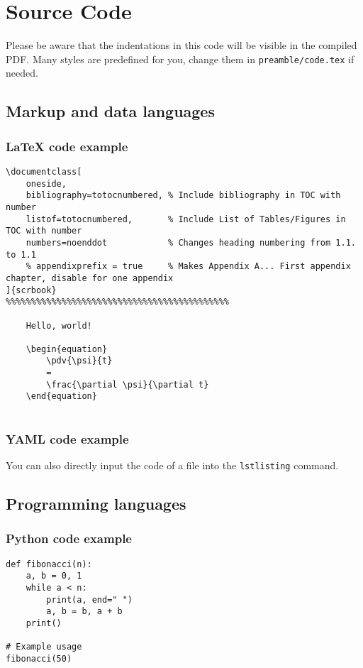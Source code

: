 \chapter{Source Code}

Please be aware that the indentations in this code will be visible in the compiled PDF. Many styles are predefined for you, change them in \texttt{preamble/code.tex} if needed.

\section{Markup and data languages}
\subsection{\LaTeX{} code example}
\begin{lstlisting}[style=latexstyle]
\documentclass[
    oneside,
    bibliography=totocnumbered, % Include bibliography in TOC with number
    listof=totocnumbered,       % Include List of Tables/Figures in TOC with number
    numbers=noenddot            % Changes heading numbering from 1.1. to 1.1
    % appendixprefix = true     % Makes Appendix A... First appendix chapter, disable for one appendix
]{scrbook}
%%%%%%%%%%%%%%%%%%%%%%%%%%%%%%%%%%%%%%%%%%%%

    Hello, world!

    \begin{equation}
        \pdv{\psi}{t}
        =
        \frac{\partial \psi}{\partial t}
    \end{equation}


\end{lstlisting}



\subsection{YAML code example}
You can also directly input the code of a file into the \verb|lstlisting| command.



\section{Programming languages}
\subsection{Python code example}
\begin{lstlisting}[style=pythonstyle]
def fibonacci(n):
    a, b = 0, 1
    while a < n:
        print(a, end=" ")
        a, b = b, a + b
    print()

# Example usage
fibonacci(50)

\end{lstlisting}

